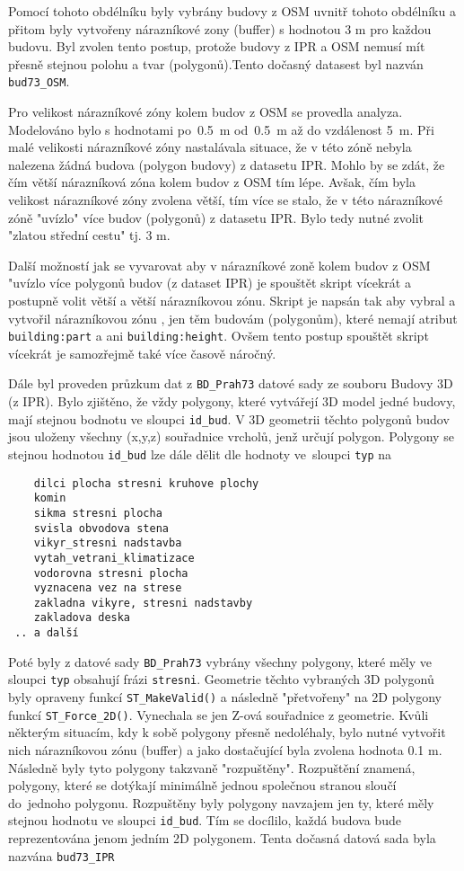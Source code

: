 Pomocí tohoto obdélníku byly vybrány budovy z OSM uvnitř tohoto obdélníku
a přitom byly vytvořeny nárazníkové zony (buffer) s hodnotou 3 m pro každou budovu.
Byl zvolen tento postup, protože budovy z IPR a OSM nemusí mít přesně stejnou
polohu a tvar (polygonů).Tento dočasný datasest byl nazván {\tt bud73\_OSM}.

Pro velikost nárazníkové zóny kolem budov z OSM se provedla analyza.
Modelováno bylo s hodnotami po~0.5~m od~0.5~m až do vzdálenost 5~m.
Při malé velikosti nárazníkové zóny nastalávala situace,
že v této zóně nebyla nalezena žádná budova (polygon budovy) z datasetu IPR.
Mohlo by se zdát, že čím větší nárazníková zóna kolem budov z OSM tím lépe.
Avšak, čím byla velikost nárazníkové zóny zvolena větší, tím více se stalo,
že v této nárazníkové zóně "uvízlo" více budov (polygonů) z datasetu IPR.
Bylo tedy nutné zvolit "zlatou střední cestu" tj. 3 m.

Další možností jak se vyvarovat aby v nárazníkové zoně kolem budov z OSM "uvízlo více
polygonů budov (z dataset IPR) je spouštět skript vícekrát a postupně volit větší
a větší nárazníkovou zónu. Skript je napsán tak aby vybral a vytvořil nárazníkovou zónu
, jen těm budovám (polygonům), které nemají atribut {\tt building:part} a ani
{\tt building:height}. Ovšem tento postup spouštět skript vícekrát je samozřejmě také
více časově náročný.

Dále byl proveden průzkum dat z {\tt BD\_Prah73} datové sady ze souboru Budovy 3D (z IPR).
Bylo zjištěno, že vždy polygony, které vytvářejí 3D model jedné budovy,
mají stejnou bodnotu ve sloupci {\tt id\_bud}.
V 3D geometrii těchto polygonů budov jsou uloženy všechny (x,y,z) souřadnice
vrcholů, jenž určují polygon.
Polygony se stejnou hodnotou {\tt id\_bud} lze dále dělit dle hodnoty
ve~sloupci {\tt typ} na
\begin{verbatim}
    dilci plocha stresni kruhove plochy
    komin
    sikma stresni plocha
    svisla obvodova stena
    vikyr_stresni nadstavba
    vytah_vetrani_klimatizace
    vodorovna stresni plocha
    vyznacena vez na strese
    zakladna vikyre, stresni nadstavby
    zakladova deska
 .. a další
\end{verbatim}

Poté byly z datové sady {\tt BD\_Prah73} vybrány všechny polygony, které
měly ve sloupci {\tt typ} obsahují frázi {\tt stresni}.
Geometrie těchto vybraných 3D polygonů byly opraveny funkcí {\tt ST\_MakeValid()}
a následně "přetvořeny" na 2D polygony funkcí {\tt ST\_Force\_2D()}.
Vynechala se jen Z-ová souřadnice z geometrie.
Kvůli některým situacím, kdy k sobě polygony přesně nedoléhaly, bylo nutné
vytvořit nich nárazníkovou zónu (buffer) a jako dostačující byla zvolena hodnota 0.1 m.
Následně byly tyto polygony takzvaně "rozpuštěny". Rozpuštění znamená,
polygony, které se dotýkají minimálně jednou společnou stranou sloučí
do~jednoho polygonu.
Rozpuštěny byly polygony navzajem jen ty, které měly stejnou hodnotu ve sloupci 
{\tt id\_bud}.
Tím se docílilo, každá budova bude reprezentována jenom jedním 2D polygonem.
Tenta dočasná datová sada byla nazvána {\tt bud73\_IPR}


